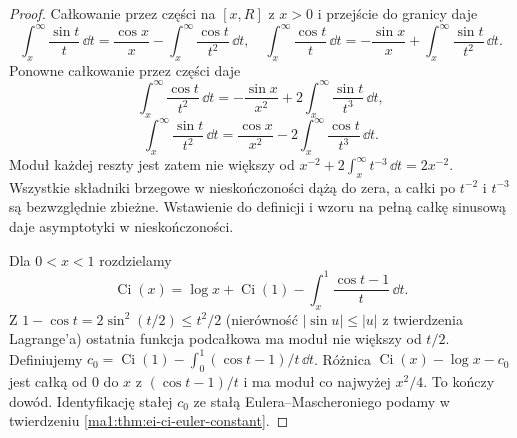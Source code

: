 \begin{proof}
Całkowanie przez części na $[x,R]$ z $x>0$ i przejście do granicy daje
\[
 \int_x^\infty\frac{\sin t}{t}\,\dd t
 =\frac{\cos x}{x}-\int_x^\infty\frac{\cos t}{t^2}\,\dd t,
 \quad
 \int_x^\infty\frac{\cos t}{t}\,\dd t
 =-\frac{\sin x}{x}+\int_x^\infty\frac{\sin t}{t^2}\,\dd t.
\]
Ponowne całkowanie przez części daje
\[
 \int_x^\infty\frac{\cos t}{t^2}\,\dd t
 =-\frac{\sin x}{x^2}+2\int_x^\infty\frac{\sin t}{t^3}\,\dd t,
\]
\[
 \int_x^\infty\frac{\sin t}{t^2}\,\dd t
 =\frac{\cos x}{x^2}-2\int_x^\infty\frac{\cos t}{t^3}\,\dd t.
\]
Moduł każdej reszty jest zatem nie większy od $x^{-2}+2\int_x^\infty t^{-3}\,\dd t=2x^{-2}$. Wszystkie składniki brzegowe w nieskończoności dążą do zera, a całki po $t^{-2}$ i $t^{-3}$ są bezwzględnie zbieżne. Wstawienie do definicji i wzoru na pełną całkę sinusową daje asymptotyki w nieskończoności.

Dla $0<x<1$ rozdzielamy
\[
 \operatorname{Ci}(x)=\log x+\operatorname{Ci}(1)
 -\int_x^1\frac{\cos t-1}{t}\,\dd t.
\]
Z $1-\cos t=2\sin^2(t/2)\le t^2/2$ (nierówność $|\sin u|\le|u|$ z twierdzenia Lagrange'a) ostatnia funkcja podcałkowa ma moduł nie większy od $t/2$. Definiujemy
$c_0=\operatorname{Ci}(1)-\int_0^1(\cos t-1)/t\,\dd t$.
Różnica $\operatorname{Ci}(x)-\log x-c_0$ jest całką od $0$ do $x$ z $(\cos t-1)/t$ i ma moduł co najwyżej $x^2/4$. To kończy dowód. Identyfikację stałej $c_0$ ze stałą Eulera--Mascheroniego podamy w twierdzeniu \ref{ma1:thm:ei-ci-euler-constant}.
\end{proof}

